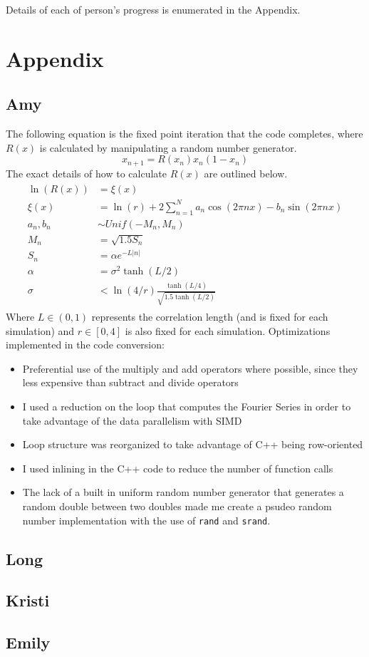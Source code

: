 \documentclass[12pt]{article}
\newcommand{\bi}{\begin{itemize}}
\newcommand{\ei}{\end{itemize}}
\begin{document}
Details of each of person's progress is enumerated in the Appendix.

\section{Appendix}
\subsection{Amy}
The following equation is the fixed point iteration that the code
completes, where $R(x)$ is calculated by manipulating a random number generator.
\begin{equation}\label{randmap}
x_{n+1} = R(x_n)x_n(1-x_n)
\end{equation}
The exact details of how to calculate $R(x)$ are outlined below.
\begin{align*}
\begin{split}
\ln(R(x)) &= \xi(x)\\
\xi(x) &= \ln(r) + 2\sum^N_{n=1}a_n\cos(2\pi nx)-b_n\sin(2\pi nx)\\
a_n,b_n &\sim Unif(-M_n,M_n)\\
M_n &= \sqrt{1.5S_n}\\
S_n &= \alpha e^{-L|n|}\\
\alpha &= \sigma^2 \tanh(L/2)\\
\sigma &< \ln(4/r)\frac{\tanh(L/4)}{\sqrt{1.5\tanh(L/2)}}
\end{split}
\end{align*}
Where $L \in (0,1)$ represents the correlation length (and is fixed
for each simulation) and $r \in [0,4]$ is also fixed for each
simulation. Optimizations implemented in the code conversion:
\bi
\item Preferential use of the  multiply and add operators where possible, since
they less expensive than subtract and divide operators
\item I used a reduction on the loop that computes the Fourier Series
  in order to take advantage of the data parallelism with SIMD
\item Loop structure was reorganized to take advantage of C++ being row-oriented
\item I used inlining in the C++ code to reduce the number of function calls
\item The lack of a built in uniform random number generator that generates a random
double between two doubles made me create a psudeo random number
implementation with the use of \texttt{rand} and \texttt{srand}.

\ei
\subsection{Long}
\subsection{Kristi}
\subsection{Emily}




\end{document}
